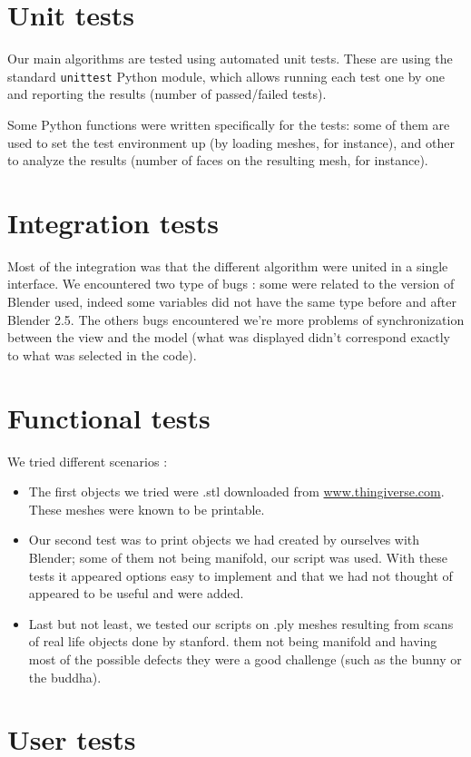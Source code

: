 \documentclass{report}
\begin{document}
\section{Unit tests}
Our main algorithms are tested using automated unit tests. These are using the standard \texttt{unittest} Python module, which allows running each test one by one and reporting the results (number of passed/failed tests).

Some Python functions were written specifically for the tests: some of them are used to set the test environment up (by loading meshes, for instance), and other to analyze the results (number of faces on the resulting mesh, for instance).

\section{Integration tests}
Most of the integration was that the different algorithm were united in a single interface. We encountered two type of bugs : some were related to the version of Blender used, indeed some variables did not have the same type before and after Blender 2.5. The others bugs encountered we're more problems of synchronization between the view and the model (what was displayed didn't correspond exactly to what was selected in the code). 

\section{Functional tests}
We tried different scenarios :
\begin{itemize}
\item The first objects we tried were .stl downloaded from \url{www.thingiverse.com}. These meshes were known to be printable.
\item Our second test was to print objects we had created by ourselves with Blender; some of them not being manifold, our script was used. With these tests it appeared options easy to implement and that we had not thought of appeared to be useful and were added.
\item Last but not least, we tested our scripts on .ply meshes resulting from scans of real life objects done by stanford. them not being manifold and having most of the possible defects they were a good challenge (such as the bunny or the buddha).  
\end{itemize}

\section{User tests}
\end{document}

